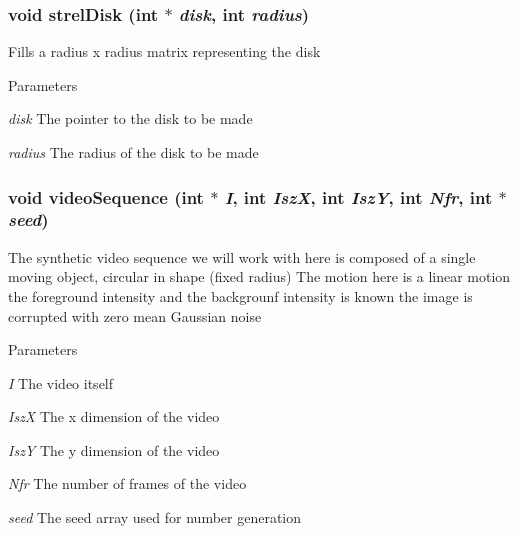 \hypertarget{ex__particle__CUDA__naive__full_8cu_a2f03f766b1c044ea6bab007e1975a23f}{
\subsubsection[{strelDisk}]{\setlength{\rightskip}{0pt plus 5cm}void strelDisk (int $\ast$ {\em disk}, \/  int {\em radius})}}
\label{ex__particle__CUDA__naive__full_8cu_a2f03f766b1c044ea6bab007e1975a23f}
Fills a radius x radius matrix representing the disk 
\begin{DoxyParams}{Parameters}
\item[{\em disk}]The pointer to the disk to be made \item[{\em radius}]The radius of the disk to be made \end{DoxyParams}
\hypertarget{ex__particle__CUDA__naive__full_8cu_a2925e128f88b60e0904210704e5ff7f5}{
\subsubsection[{videoSequence}]{\setlength{\rightskip}{0pt plus 5cm}void videoSequence (int $\ast$ {\em I}, \/  int {\em IszX}, \/  int {\em IszY}, \/  int {\em Nfr}, \/  int $\ast$ {\em seed})}}
\label{ex__particle__CUDA__naive__full_8cu_a2925e128f88b60e0904210704e5ff7f5}
The synthetic video sequence we will work with here is composed of a single moving object, circular in shape (fixed radius) The motion here is a linear motion the foreground intensity and the backgrounf intensity is known the image is corrupted with zero mean Gaussian noise 
\begin{DoxyParams}{Parameters}
\item[{\em I}]The video itself \item[{\em IszX}]The x dimension of the video \item[{\em IszY}]The y dimension of the video \item[{\em Nfr}]The number of frames of the video \item[{\em seed}]The seed array used for number generation \end{DoxyParams}
